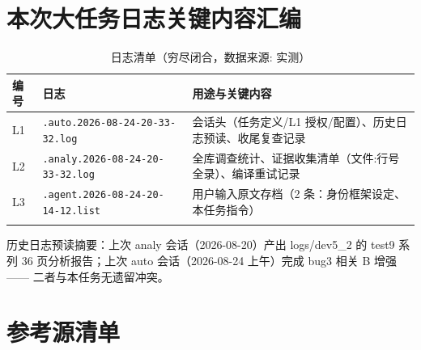 \documentclass[UTF8]{ctexart}
\begin{document}
\section{本次大任务日志关键内容汇编}

\begin{xltabular}{\textwidth}{llX}
\toprule
编号 & 日志 & 用途与关键内容 \\
\midrule
\endhead
L1 & \texttt{\nolinkurl{.auto.2026-08-24-20-33-32.log}} & 会话头（任务定义/L1 授权/配置）、历史日志预读、收尾复查记录 \\
L2 & \texttt{\nolinkurl{.analy.2026-08-24-20-33-32.log}} & 全库调查统计、证据收集清单（文件:行号 全录）、编译重试记录 \\
L3 & \texttt{\nolinkurl{.agent.2026-08-24-20-14-12.list}} & 用户输入原文存档（2 条：身份框架设定、本任务指令） \\
\bottomrule
\caption{日志清单（穷尽闭合，数据来源: 实测）}
\end{xltabular}

历史日志预读摘要：上次 analy 会话（2026-08-20）产出 logs/dev5\_2 的 test9 系列
36 页分析报告；上次 auto 会话（2026-08-24 上午）完成 bug3 相关 B 增强——
二者与本任务无遗留冲突。

\section{参考源清单}
\end{document}
